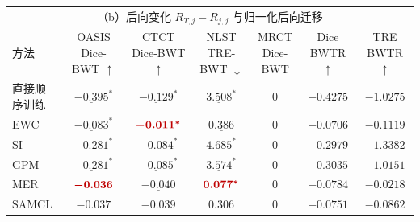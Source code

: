 \begin{table}[htbp]
\vspace{8pt}
\begin{tabular*}{\textwidth}{@{\extracolsep{\fill}}lcccccc@{}}
\toprule
\multicolumn{7}{c}{（b）后向变化 $R_{T,j}-R_{j,j}$ 与归一化后向迁移} \\
方法 & \shortstack{OASIS\\Dice-BWT $\uparrow$} & \shortstack{CTCT\\Dice-BWT $\uparrow$} & \shortstack{NLST\\TRE-BWT $\downarrow$} & \shortstack{MRCT\\Dice-BWT} & \shortstack{Dice\\BWTR$\uparrow$} & \shortstack{TRE\\BWTR$\uparrow$} \\
\midrule
直接顺序训练 & $\underline{-0.395}^{*}$ & $\underline{-0.129}^{*}$ & $\underline{3.508}^{*}$ & 0 & $-0.4275$ & $-1.0275$ \\
EWC & $\underline{-0.083}^{*}$ & $\best{-0.011^{*}}$ & $\underline{0.386}$ & 0 & $-0.0706$ & $-0.1119$ \\
SI & $\underline{-0.281}^{*}$ & $\underline{-0.084}^{*}$ & $\underline{4.685}^{*}$ & 0 & $-0.2979$ & $-1.3382$ \\
GPM & $\underline{-0.281}^{*}$ & $\underline{-0.085}^{*}$ & $\underline{3.574}^{*}$ & 0 & $-0.3035$ & $-1.0151$ \\
MER & $\best{-0.036}$ & $\underline{-0.040}$ & $\best{0.077^{*}}$ & 0 & $-0.0784$ & $-0.0218$ \\
SAMCL & $-0.037$ & $-0.039$ & 0.306 & 0 & $-0.0751$ & $-0.0862$ \\
\bottomrule
\end{tabular*}
\end{table}
